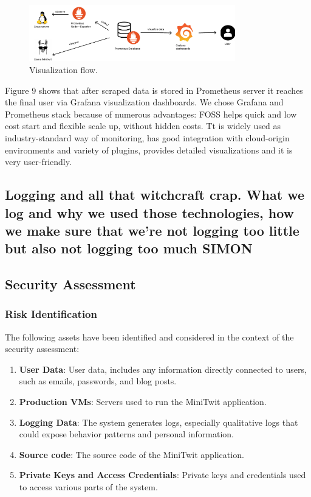 \documentclass{article}
\begin{document}
\begin{figure}[ht]
    \centering
    \includegraphics[width=0.8\textwidth]{./pdfs/visualization_flow.pdf} 
    \caption{Visualization flow.}
    \label{fig:visualization flow}
\end{figure}

Figure 9 shows that after scraped data is stored in Prometheus server it reaches the final user via Grafana visualization dashboards. We chose Grafana and Prometheus stack because of numerous advantages: FOSS helps quick and low cost start and flexible scale up, without hidden costs. Tt is widely used as industry-standard way of monitoring, has good integration with cloud-origin environments and variety of plugins, provides detailed visualizations and it is very user-friendly. 


\subsection{Logging and all that witchcraft crap. What we log and why we used those technologies, how we make sure that we're not logging too little but also not logging too much SIMON}

\subsection{Security Assessment}

\subsubsection{Risk Identification}
The following assets have been identified and considered in the context of the security assessment:

\begin{enumerate}
\item \textbf{User Data}: User data, includes any information directly connected to users, such as emails, passwords, and blog posts.
\item \textbf{Production VMs}: Servers used to run the MiniTwit application.
\item \textbf{Logging Data}: The system generates logs, especially qualitative logs that could expose behavior patterns and personal information.
\item \textbf{Source code}: The source code of the MiniTwit application.
\item \textbf{Private Keys and Access Credentials}: Private keys and credentials used to access various parts of the system.
\end{enumerate}
\end{document}
